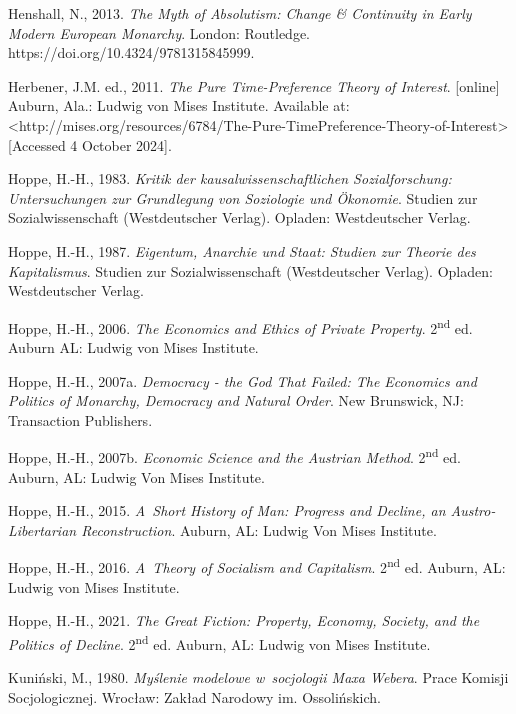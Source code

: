 Henshall, N., 2013. \textit{The Myth of Absolutism: Change \& Continuity in Early Modern European Monarchy}. London: Routledge. https://doi.org/10.4324/9781315845999.



Herbener, J.M. ed., 2011. \textit{The Pure Time-Preference Theory of Interest}. [online] Auburn, Ala.: Ludwig von Mises Institute. Available at: {\textless}http://mises.org/resources/6784/The-Pure-TimePreference-Theory-of-Interest{\textgreater} [Accessed 4 October 2024].



Hoppe, H.-H., 1983. \textit{Kritik der kausalwissenschaftlichen Sozialforschung: Untersuchungen zur Grundlegung von Soziologie und Ökonomie}. Studien zur Sozialwissenschaft (Westdeutscher Verlag). Opladen: Westdeutscher Verlag.



Hoppe, H.-H., 1987. \textit{Eigentum, Anarchie und Staat: Studien zur Theorie des Kapitalismus}. Studien zur Sozialwissenschaft (Westdeutscher Verlag). Opladen: Westdeutscher Verlag.



Hoppe, H.-H., 2006. \textit{The Economics and Ethics of Private Property}. 2\textsuperscript{nd} ed. Auburn AL: Ludwig von Mises Institute.



Hoppe, H.-H., 2007a. \textit{Democracy - the God That Failed: The Economics and Politics of Monarchy, Democracy and Natural Order}. New Brunswick, NJ: Transaction Publishers.



Hoppe, H.-H., 2007b. \textit{Economic Science and the Austrian Method}. 2\textsuperscript{nd} ed. Auburn, AL: Ludwig Von Mises Institute.



Hoppe, H.-H., 2015. \textit{A~Short History of Man: Progress and Decline, an Austro-Libertarian Reconstruction}. Auburn, AL: Ludwig Von Mises Institute.



Hoppe, H.-H., 2016. \textit{A~Theory of Socialism and Capitalism}. 2\textsuperscript{nd} ed. Auburn, AL: Ludwig von Mises Institute.



Hoppe, H.-H., 2021. \textit{The Great Fiction: Property, Economy, Society, and the Politics of Decline}. 2\textsuperscript{nd} ed. Auburn, AL: Ludwig von Mises Institute.



Kuniński, M., 1980. \textit{Myślenie modelowe w~socjologii Maxa Webera}. Prace Komisji Socjologicznej. Wrocław: Zakład Narodowy im. Ossolińskich.



